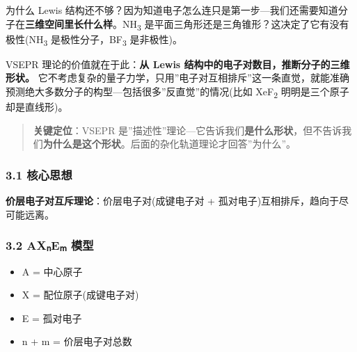 \documentclass[a4paper,11pt]{ctexart}
\providecommand{\tightlist}{\setlength{\itemsep}{0pt}\setlength{\parskip}{0pt}}
\newcommand{\箭}{\ensuremath{\rightarrow}}
\newcommand{\左箭}{\ensuremath{\leftarrow}}
\newcommand{\上箭}{\ensuremath{\uparrow}}
\newcommand{\下箭}{\ensuremath{\downarrow}}
\newcommand{\衡}{\ensuremath{\rightleftharpoons}}
\newcommand{\双箭}{\ensuremath{\leftrightarrow}}
\newcommand{\约等于}{\ensuremath{\approx}}
\newcommand{\小于等于}{\ensuremath{\leq}}
\newcommand{\大于等于}{\ensuremath{\geq}}
\newcommand{\不等于}{\ensuremath{\neq}}
\newcommand{\西格马}{\ensuremath{\sigma}}
\newcommand{\派}{\ensuremath{\pi}}
\begin{document}
为什么 Lewis 结构还不够？因为知道电子怎么连只是第一步---我们还需要知道分子在\textbf{三维空间里长什么样}。NH\textsubscript{3} 是平面三角形还是三角锥形？这决定了它有没有极性(NH\textsubscript{3} 是极性分子，BF\textsubscript{3} 是非极性)。

VSEPR 理论的价值就在于此：\textbf{从 Lewis 结构中的电子对数目，推断分子的三维形状。} 它不考虑复杂的量子力学，只用''电子对互相排斥''这一条直觉，就能准确预测绝大多数分子的构型---包括很多''反直觉''的情况(比如 XeF\textsubscript{2} 明明是三个原子却是直线形)。

\begin{quote}
\textbf{关键定位}：VSEPR 是''描述性''理论---它告诉我们\textbf{是什么形状}，但不告诉我们\textbf{为什么是这个形状}。后面的杂化轨道理论才回答''为什么''。
\end{quote}

\subsubsection{3.1 核心思想}\label{ux6838ux5fc3ux601dux60f3}

\textbf{价层电子对互斥理论}：价层电子对(成键电子对 + 孤对电子)互相排斥，趋向于尽可能远离。

\subsubsection{3.2 AXₙEₘ 模型}\label{axux2099eux2098-ux6a21ux578b}

\begin{itemize}
\tightlist
\item
  A = 中心原子
\item
  X = 配位原子(成键电子对)
\item
  E = 孤对电子
\item
  n + m = 价层电子对总数
\end{itemize}
\end{document}
